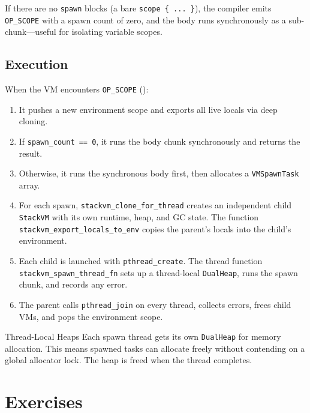 If there are no \lstinline|spawn| blocks (a bare \lstinline|scope { ... }|), the compiler emits \lstinline|OP_SCOPE| with a spawn count of zero, and the body runs synchronously as a sub-chunk---useful for isolating variable scopes.

\subsection{Execution}

When the VM encounters \lstinline|OP_SCOPE| ():

\begin{enumerate}
  \item It pushes a new environment scope and exports all live locals via deep cloning.
  \item If \texttt{spawn\_count == 0}, it runs the body chunk synchronously and returns the result.
  \item Otherwise, it runs the synchronous body first, then allocates a \texttt{VMSpawnTask} array.
  \item For each spawn, \texttt{stackvm\_clone\_for\_thread} creates an independent child \texttt{StackVM} with its own runtime, heap, and GC state. The function \texttt{stackvm\_export\_locals\_to\_env} copies the parent's locals into the child's environment.
  \item Each child is launched with \texttt{pthread\_create}. The thread function \texttt{stackvm\_spawn\_thread\_fn} sets up a thread-local \texttt{DualHeap}, runs the spawn chunk, and records any error.
  \item The parent calls \texttt{pthread\_join} on every thread, collects errors, frees child VMs, and pops the environment scope.
\end{enumerate}

\begin{notebox}{Thread-Local Heaps}
Each spawn thread gets its own \texttt{DualHeap} for memory allocation.
This means spawned tasks can allocate freely without contending on a global allocator lock.
The heap is freed when the thread completes.
\end{notebox}

\section{Exercises}\label{sec:ch19-exercises}


